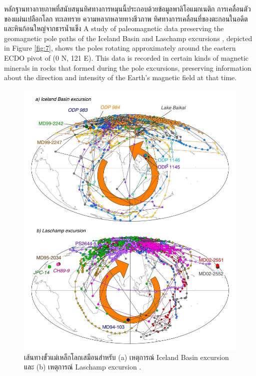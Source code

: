 \documentclass[10pt,twocolumn,letterpaper]{article}
\begin{document}
หลักฐานทางกายภาพที่สนับสนุนทิศทางการหมุนนี้ประกอบด้วยข้อมูลพาลิโอแมกเนติก การเคลื่อนตัวของแผ่นเปลือกโลก ทะเลทราย ความหลากหลายทางชีวภาพ ทิศทางการเคลื่อนที่ของตะกอนในอดีต และหินก้อนใหญ่จากธารน้ำแข็ง
A study of paleomagnetic data preserving the geomagnetic pole paths of the Iceland Basin and Laschamp excursions \cite{35}, depicted in Figure \ref{fig:7}, shows the poles rotating approximately around the eastern ECDO pivot of (0 N, 121 E). This data is recorded in certain kinds of magnetic minerals in rocks that formed during the pole excursions, preserving information about the direction and intensity of the Earth's magnetic field at that time.

\begin{figure}[t]
\begin{center}
   \includegraphics[width=0.95\linewidth]{laj.jpg}
\end{center}
   \caption{เส้นทางขั้วแม่เหล็กโลกเสมือนสำหรับ (a) เหตุการณ์ Iceland Basin excursion และ (b) เหตุการณ์ Laschamp excursion \cite{35}.}
\label{fig:7}
\label{fig:onecol}
\end{figure}
\end{document}
